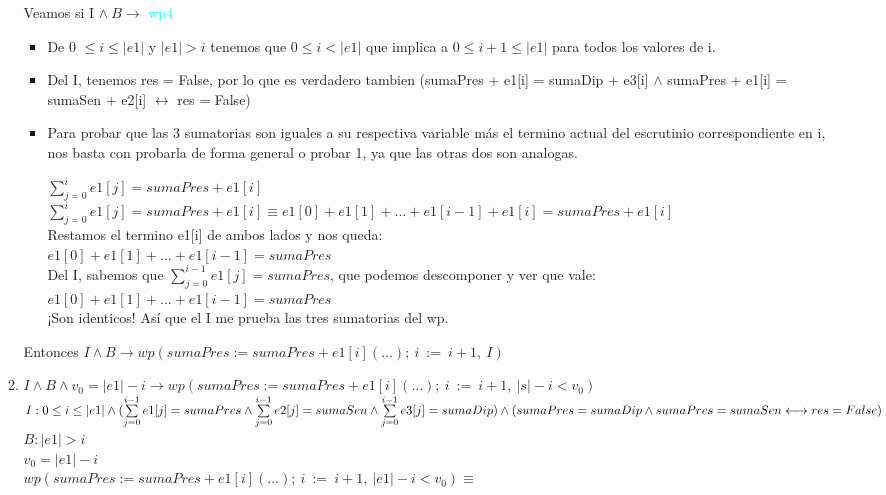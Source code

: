 \documentclass[10pt,a4paper]{article}
\begin{document}
\begin{enumerate}
\begin{enumerate}
Veamos si I $\land \: B \longrightarrow$ \textcolor{cyan}{wp4}
\begin{itemize}
    \item De 0 $\leq i \leq |e1|$ y $|e1| > i$ tenemos que $0 \leq i < |e1|$ que implica a $0 \leq i + 1 \leq |e1|$ para todos los valores de i.
    \item Del I, tenemos res = False, por lo que es verdadero tambien (sumaPres + e1[i] = sumaDip + e3[i]  $\land$ sumaPres + e1[i] = sumaSen + e2[i] $\longleftrightarrow$ res = False)
    \item Para probar que las 3 sumatorias son iguales a su respectiva variable más el termino actual del escrutinio correspondiente en i, nos basta con probarla de forma general o probar 1, ya que las otras dos son analogas.
    \begin{center}
        $\sum\limits_{j=0}^{i} e1[j] = sumaPres + e1[i]$
        $\sum\limits_{j=0}^{i} e1[j] = sumaPres + e1[i] \equiv e1[0] + e1[1] + ... + e1[i-1] + e1[i] = sumaPres + e1[i] $ \\
        Restamos el termino e1[i] de ambos lados y nos queda: \\
        
        $e1[0] + e1[1] + ... + e1[i-1] = sumaPres$\\

        Del I, sabemos que $\sum\limits_{j=0}^{i - 1} e1[j] = sumaPres$, que podemos descomponer y ver que vale: \\
        $e1[0] + e1[1] + ... + e1[i-1] = sumaPres$ \\
        ¡Son identicos! Así que el I me prueba las tres sumatorias del wp.
    \end{center}
\end{itemize}
Entonces $I \land B \longrightarrow wp(sumaPres := sumaPres + e1[i](\ldots);\: i \: := \: i + 1, \: I)$

\item $I \land B \land v_0 = |e1| - i \longrightarrow wp(sumaPres := sumaPres + e1[i](\ldots);\: i \: := \: i + 1, \: |s| - i < v_0)$\\
$I : 0 \leq i \leq |e1| \land (\sum\limits_{j=0}^{i - 1} e1[j] = sumaPres \land \sum\limits_{j=0}^{i - 1} e2[j] = sumaSen \land \sum\limits_{j=0}^{i - 1} e3[j] = sumaDip) \land \\
    (sumaPres = sumaDip  \land sumaPres = sumaSen \longleftrightarrow res = False)$ \\
$B : |e1| > i$ \\
$v_0 = |e1| - i$ \\
$wp(sumaPres := sumaPres + e1[i](\ldots);\: i \: := \: i + 1, \: |e1| - i < v_0) \equiv$


\end{enumerate}
\end{enumerate}
\end{document}
